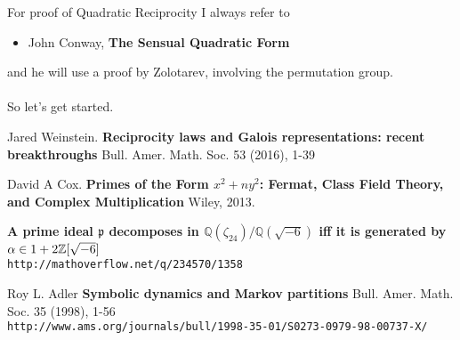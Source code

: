 \documentclass[12pt]{article}
\begin{document}
\newpage

\newpage  

\noindent For proof of Quadratic Reciprocity I always refer to
\begin{itemize}
\item John Conway, \textbf{The Sensual Quadratic Form}
\end{itemize}
and he will use a proof by Zolotarev, involving the permutation group. \\ \\
So let's get started.

\newpage

\selectfont \fontsize{12}{10}\selectfont


\begin{thebibliography}{}

\item Jared Weinstein. \textbf{Reciprocity laws and Galois representations: recent breakthroughs} Bull. Amer. Math. Soc. 53 (2016), 1-39 

\item David A Cox. \textbf{Primes of the Form $x^2+ny^2$: Fermat, Class Field Theory, and Complex Multiplication} Wiley, 2013.

\item \textbf{A prime ideal $\mathfrak{p}$ decomposes in $\mathbb{Q}(\zeta_{24})/\mathbb{Q}(\sqrt{-6})$ iff it is generated by $\alpha\in1+2\Bbb{Z}[\sqrt{-6}]$} \\ \texttt{http://mathoverflow.net/q/234570/1358}

\item Roy L. Adler \textbf{Symbolic dynamics and Markov partitions}  Bull. Amer. Math. Soc. 35 (1998), 1-56  \\ \texttt{http://www.ams.org/journals/bull/1998-35-01/S0273-0979-98-00737-X/}


\end{thebibliography}
\end{document}
